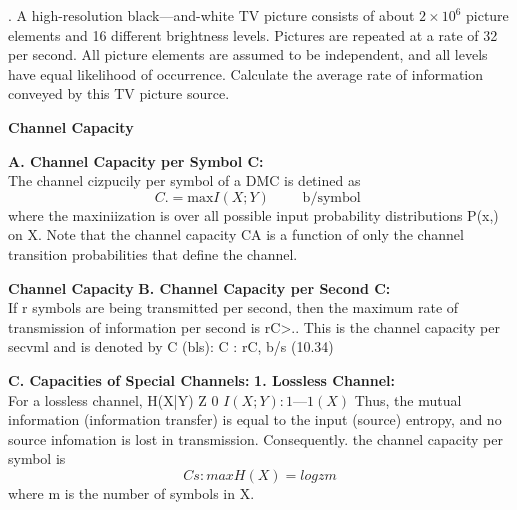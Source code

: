 \documentclass[a4]{beamer}
\begin{document}


. A high-resolution black—and-white TV picture consists of about $2 \times 10^6$  picture elements and 16
different brightness levels. Pictures are repeated at a rate of 32 per second. All picture elements
are assumed to be independent, and all levels have equal likelihood of occurrence. Calculate the
average rate of information conveyed by this TV picture source.\\ \bigskip






\medskip
\noindent \textbf{Channel Capacity}

\textbf{A. Channel Capacity per Symbol C:}\\
The channel cizpucily per symbol of a DMC is detined as
\[ 
C. = \mbox{max}I(X; Y) \qquad \mbox{ b/symbol }
\]
where the maxiniization is over all possible input probability distributions {P(x,)} on X. Note that the
channel capacity CA is a function of only the channel transition probabilities that define the channel.


\medskip
\noindent \textbf{Channel Capacity}
\textbf{B. Channel Capacity per Second C:}\\
If r symbols are being transmitted per second, then the maximum rate of transmission of
information per second is rC>.. This is the channel capacity per secvml and is denoted by C (bls):
C : rC, b/s (10.34)

\medskip
\noindent \textbf{C. Capacities of Special Channels:}
\textbf{ 1. Lossless Channel:}\\
For a lossless channel, H(X|Y) Z 0 %
$I(X; Y):1—1(X) $
Thus, the mutual information (information transfer) is equal to the input (source) entropy, and no
source infomation is lost in transmission. Consequently. the channel capacity per symbol is
\[
Cs : max H(X) = logzm %
\]
where m is the number of symbols in X.
\end{document}
